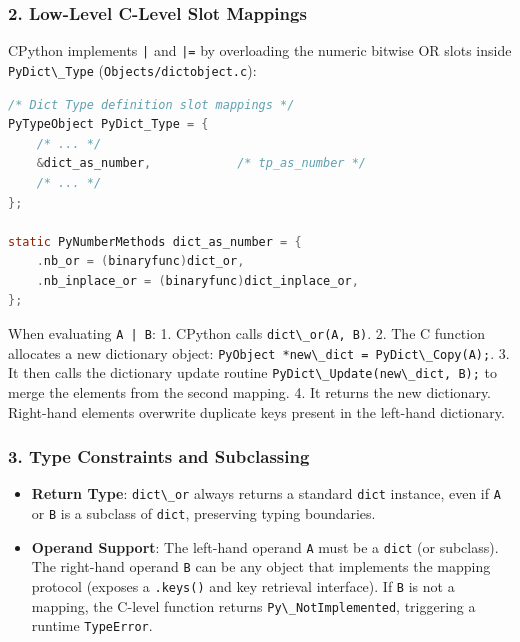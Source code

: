 \hypertarget{low-level-c-level-slot-mappings}{%
\subsubsection{2. Low-Level C-Level Slot
Mappings}\label{low-level-c-level-slot-mappings}}

CPython implements \passthrough{\lstinline!|!} and
\passthrough{\lstinline!|=!} by overloading the numeric bitwise OR slots
inside \passthrough{\lstinline!PyDict\_Type!}
(\passthrough{\lstinline!Objects/dictobject.c!}):

\begin{lstlisting}[language=C]
/* Dict Type definition slot mappings */
PyTypeObject PyDict_Type = {
    /* ... */
    &dict_as_number,            /* tp_as_number */
    /* ... */
};

static PyNumberMethods dict_as_number = {
    .nb_or = (binaryfunc)dict_or,
    .nb_inplace_or = (binaryfunc)dict_inplace_or,
};
\end{lstlisting}

When evaluating \passthrough{\lstinline!A | B!}: 1. CPython calls
\passthrough{\lstinline!dict\_or(A, B)!}. 2. The C function allocates a
new dictionary object:
\passthrough{\lstinline!PyObject *new\_dict = PyDict\_Copy(A);!}. 3. It
then calls the dictionary update routine
\passthrough{\lstinline!PyDict\_Update(new\_dict, B);!} to merge the
elements from the second mapping. 4. It returns the new dictionary.
Right-hand elements overwrite duplicate keys present in the left-hand
dictionary.

\hypertarget{type-constraints-and-subclassing}{%
\subsubsection{3. Type Constraints and
Subclassing}\label{type-constraints-and-subclassing}}

\begin{itemize}
\tightlist
\item
  \textbf{Return Type}: \passthrough{\lstinline!dict\_or!} always
  returns a standard \passthrough{\lstinline!dict!} instance, even if
  \passthrough{\lstinline!A!} or \passthrough{\lstinline!B!} is a
  subclass of \passthrough{\lstinline!dict!}, preserving typing
  boundaries.
\item
  \textbf{Operand Support}: The left-hand operand
  \passthrough{\lstinline!A!} must be a \passthrough{\lstinline!dict!}
  (or subclass). The right-hand operand \passthrough{\lstinline!B!} can
  be any object that implements the mapping protocol (exposes a
  \passthrough{\lstinline!.keys()!} and key retrieval interface). If
  \passthrough{\lstinline!B!} is not a mapping, the C-level function
  returns \passthrough{\lstinline!Py\_NotImplemented!}, triggering a
  runtime \passthrough{\lstinline!TypeError!}.
\end{itemize}

